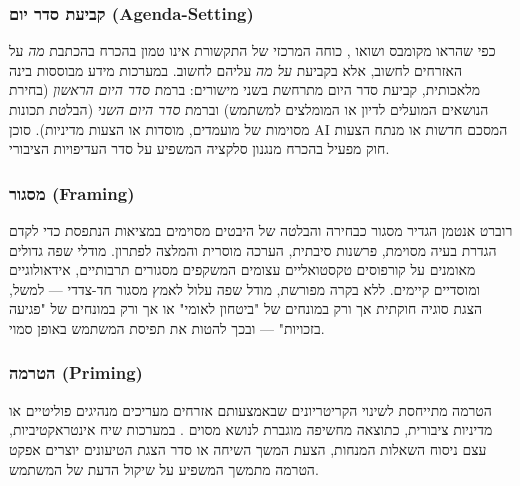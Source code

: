 \subsubsection{קביעת סדר יום (Agenda-Setting)}
כפי שהראו מקומבס ושואו \cite{mccombs1972agenda}, כוחה המרכזי של התקשורת אינו טמון בהכרח בהכתבת \emph{מה} על האזרחים לחשוב, אלא בקביעת \emph{על מה} עליהם לחשוב. במערכות מידע מבוססות בינה מלאכותית, קביעת סדר היום מתרחשת בשני מישורים: ברמת \emph{סדר היום הראשון} (בחירת הנושאים המועלים לדיון או המומלצים למשתמש) וברמת \emph{סדר היום השני} (הבלטת תכונות מסוימות של מועמדים, מוסדות או הצעות מדיניות). סוכן AI המסכם חדשות או מנתח הצעות חוק מפעיל בהכרח מנגנון סלקציה המשפיע על סדר העדיפויות הציבורי.

\subsubsection{מסגור (Framing)}
רוברט אנטמן \cite{entman1993framing} הגדיר מסגור כבחירה והבלטה של היבטים מסוימים במציאות הנתפסת כדי לקדם הגדרת בעיה מסוימת, פרשנות סיבתית, הערכה מוסרית והמלצה לפתרון. מודלי שפה גדולים מאומנים על קורפוסים טקסטואליים עצומים המשקפים מסגורים תרבותיים, אידאולוגיים ומוסדיים קיימים. ללא בקרה מפורשת, מודל שפה עלול לאמץ מסגור חד-צדדי --- למשל, הצגת סוגיה חוקתית אך ורק במונחים של "ביטחון לאומי" או אך ורק במונחים של "פגיעה בזכויות" --- ובכך להטות את תפיסת המשתמש באופן סמוי.

\subsubsection{הטרמה (Priming)}
הטרמה מתייחסת לשינוי הקריטריונים שבאמצעותם אזרחים מעריכים מנהיגים פוליטיים או מדיניות ציבורית, כתוצאה מחשיפה מוגברת לנושא מסוים \cite{scheufele2007framing}. במערכות שיח אינטראקטיביות, עצם ניסוח השאלות המנחות, הצעת המשך השיחה או סדר הצגת הטיעונים יוצרים אפקט הטרמה מתמשך המשפיע על שיקול הדעת של המשתמש.

